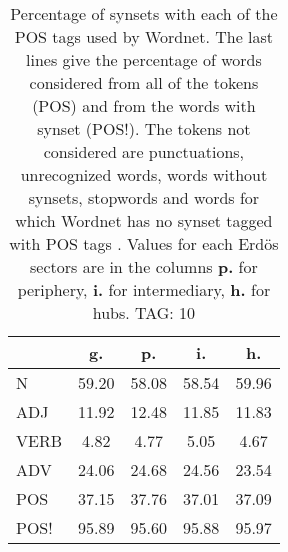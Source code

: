 \begin{table}[h!]
\begin{center}
\begin{tabular}{| l || c | c | c | c |}\hline
 & {\bf g.} & {\bf p.} & {\bf i.} & {\bf h.} \\\hline\hline
N & 59.20  & 58.08  & 58.54  & 59.96 \\\hline
ADJ & 11.92  & 12.48  & 11.85  & 11.83 \\\hline
VERB & 4.82  & 4.77  & 5.05  & 4.67 \\\hline
ADV & 24.06  & 24.68  & 24.56  & 23.54 \\\hline\hline
POS & 37.15  & 37.76  & 37.01  & 37.09 \\\hline
POS! & 95.89  & 95.60  & 95.88  & 95.97 \\\hline
\end{tabular}
\caption{Percentage of synsets with each of the POS tags used by Wordnet. The last lines give the percentage of words considered from all of the tokens (POS) and from the words with synset (POS!). The tokens not considered are punctuations, unrecognized words, words without synsets, stopwords and words for which Wordnet has no synset  tagged with POS tags . Values for each Erd\"os sectors are in the columns {{\bf p.}} for periphery, {{\bf i.}} for intermediary, {{\bf h.}} for hubs. TAG: 10}
\end{center}
\end{table}